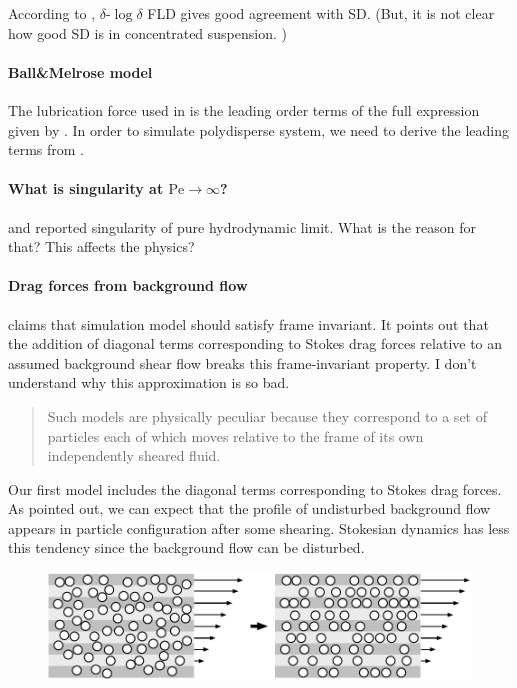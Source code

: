 \documentclass[11pt]{scrartcl}
\begin{document}
According to \citet{Kumar_2010a},
$\delta$-$\log\delta $ FLD gives
good agreement with SD.
%
(But, it is not clear
how good SD is in concentrated suspension.
)



\paragraph{Ball\&Melrose model}

The lubrication force used in \cite{Ball_1997}
is the leading order terms of 
the full expression given by \citet{Jeffrey_1992}.
%
In order to simulate  polydisperse system,
we need to derive 
the leading terms from \citet{Jeffrey_1992}.


\paragraph{What is singularity at $\mathrm{Pe}\to \infty$?}

\citet{Ball_1995}
and \citet{Melrose_1995}
reported singularity of pure hydrodynamic limit.
%
What is the reason for that?
%
This affects the physics?
%

\paragraph{Drag forces from background flow}

\citet{Ball_1997} claims that 
simulation model should satisfy frame invariant.
%
It points out that
the addition of diagonal terms corresponding to
Stokes drag forces
relative to an assumed background shear flow
breaks this frame-invariant property.
%
I don't understand why this approximation is so bad.
%
\begin{quote}
Such models are physically peculiar
because they correspond to a set of particles
each of which moves relative to the frame
of its own independently sheared fluid. 
\end{quote}

Our first model includes the diagonal terms corresponding to
Stokes drag forces.
%
As \citet{Ball_1997} pointed out,
we can expect that 
the profile of undisturbed background flow appears
in particle configuration after some shearing.
%
Stokesian dynamics has less this tendency
since the background flow can be disturbed.
\begin{figure}[htbp]
\begin{center}
\includegraphics[width=12cm]{order_with_undisturbed_shearflow.pdf} 
\end{center}
\end{figure}
\end{document}
